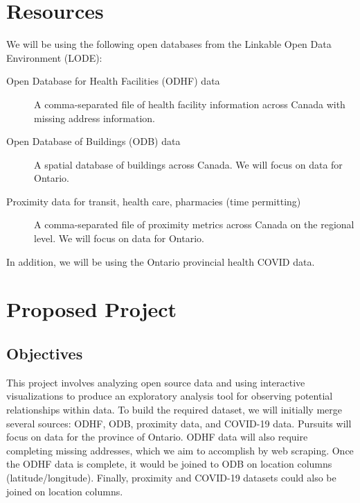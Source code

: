 \documentclass{article}
\begin{document}

\section{Resources}
\label{Data}
We will be using the following open databases from the Linkable Open Data Environment (LODE):

\begin{description}

\item[Open Database for Health Facilities (ODHF) data]
A comma-separated file of health facility information across Canada with missing address information.

\item[Open Database of Buildings (ODB) data]
A spatial database of buildings across Canada. We will focus on data for Ontario.

\item[Proximity data for transit, health care, pharmacies (time permitting)]
A comma-separated file of proximity metrics across Canada on the regional level. We will focus on data for Ontario.

\end{description} 

In addition, we will be using the Ontario provincial health COVID data. 
 
  

\section{Proposed Project}

\subsection{Objectives}

This project involves analyzing open source data and using interactive visualizations to produce an exploratory analysis tool for observing potential relationships within data. To build the required dataset, we will initially merge several sources: ODHF, ODB, proximity data, and COVID-19 data. Pursuits will focus on data for the province of Ontario. ODHF data will also require completing missing addresses, which we aim to accomplish by web scraping. Once the ODHF data is complete, it would be joined to ODB on location columns (latitude/longitude). Finally, proximity and COVID-19 datasets could also be joined on location columns.\\
\end{document}
